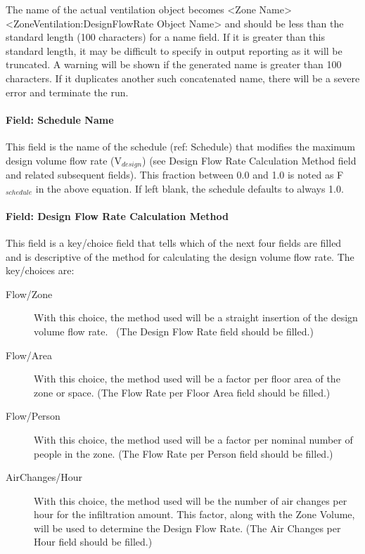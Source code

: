 The name of the actual ventilation object becomes \textless{}Zone Name\textgreater{} \textless{}ZoneVentilation:DesignFlowRate Object Name\textgreater{} and should be less than the standard length (100 characters) for a name field. If it is greater than this standard length, it may be difficult to specify in output reporting as it will be truncated. A warning will be shown if the generated name is greater than 100 characters. If it duplicates another such concatenated name, there will be a severe error and terminate the run.

\paragraph{Field: Schedule Name}\label{field-schedule-name-2016-06-16}

This field is the name of the schedule (ref: Schedule) that modifies the maximum design volume flow rate (V\(_{design}\)) (see Design Flow Rate Calculation Method field and related subsequent fields). This fraction between 0.0 and 1.0 is noted as F\(_{schedule}\) in the above equation. If left blank, the schedule defaults to always 1.0.

\paragraph{Field: Design Flow Rate Calculation Method}\label{field-design-flow-rate-calculation-method-1}

This field is a key/choice field that tells which of the next four fields are filled and is descriptive of the method for calculating the design volume flow rate. The key/choices are:

\begin{description}

\item[Flow/Zone] With this choice, the method used will be a straight insertion of the design volume flow rate.~ (The Design Flow Rate field should be filled.)

\item[Flow/Area] With this choice, the method used will be a factor per floor area of the zone or space. (The Flow Rate per Floor Area field should be filled.)

\item[Flow/Person] With this choice, the method used will be a factor per nominal number of people in the zone. (The Flow Rate per Person field should be filled.)

\item[AirChanges/Hour] With this choice, the method used will be the number of air changes per hour for the infiltration amount. This factor, along with the Zone Volume, will be used to determine the Design Flow Rate. (The Air Changes per Hour field should be filled.)

\end{description}

